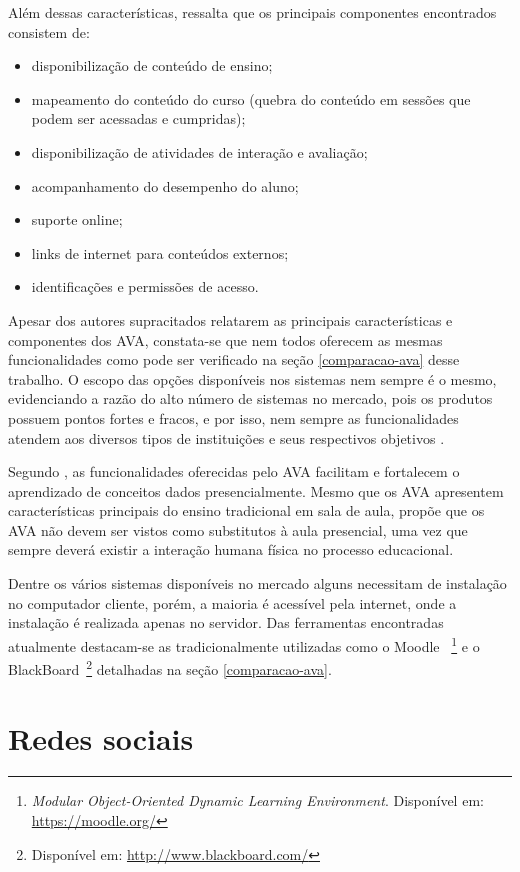 Além dessas características,  ressalta que os principais componentes encontrados consistem de:
\begin{itemize}
\item disponibilização de conteúdo de ensino;
\item mapeamento do conteúdo do curso (quebra do conteúdo em sessões que podem ser acessadas e cumpridas);
\item disponibilização de atividades de interação e avaliação;
\item acompanhamento do desempenho do aluno;
\item suporte online;
\item links de internet para conteúdos externos;
\item identificações e permissões de acesso.
\end{itemize}

Apesar dos autores supracitados relatarem as principais características e componentes dos AVA, constata-se que nem todos oferecem as mesmas funcionalidades como pode ser verificado na seção \ref{comparacao-ava} desse trabalho. O escopo das opções disponíveis nos sistemas nem sempre é o mesmo, evidenciando a razão do alto número de sistemas no mercado, pois os produtos possuem pontos fortes e fracos, e por isso, nem sempre as funcionalidades atendem aos diversos tipos de instituições e seus respectivos objetivos \cite{aguado2013dimensoes}.

Segundo , as funcionalidades oferecidas pelo AVA facilitam e fortalecem o aprendizado de conceitos dados presencialmente. Mesmo que os AVA apresentem características principais do ensino tradicional em sala de aula,  propõe que os AVA não devem ser vistos como substitutos à aula presencial, uma vez que sempre deverá existir a interação humana física no processo educacional.

Dentre os vários sistemas disponíveis no mercado alguns necessitam de instalação no computador cliente, porém, a maioria é acessível pela internet, onde a instalação é realizada apenas no servidor. Das ferramentas encontradas atualmente destacam-se as tradicionalmente utilizadas como o Moodle ~\footnote{\textit{Modular Object-Oriented Dynamic Learning Environment}. Disponível em: \url{https://moodle.org/}} e o BlackBoard~\footnote{Disponível em: \url{http://www.blackboard.com/}} detalhadas na seção \ref{comparacao-ava}.

\section{Redes sociais}
\label{rede-social}

